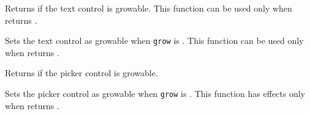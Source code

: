 \label{wxpickerbaseistextctrlgrowable}


Returns \true if the text control is growable.
This function can be used only when  returns \true.


\label{wxpickerbasesettextctrlgrowable}


Sets the text control as growable when {\tt grow} is \true.
This function can be used only when  returns \true.



\label{wxpickerbaseispickerctrlgrowable}


Returns \true if the picker control is growable.


\label{wxpickerbasesetpickerctrlgrowable}


Sets the picker control as growable when {\tt grow} is \true.
This function has effects only when  returns \true.

